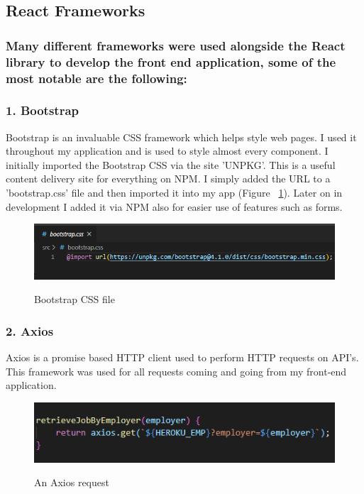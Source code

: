 \subsection{React Frameworks}
\subsubsection{Many different frameworks were used alongside the React library to develop the front end application, some of the most notable are the following:}

\subsubsection{1. Bootstrap}
Bootstrap is an invaluable CSS framework which helps style web pages. I used it throughout my application and is used to style almost every component. I initially imported the Bootstrap CSS via the site 'UNPKG'. This is a useful content delivery site for everything on NPM. I simply added the URL to a 'bootstrap.css' file and then imported it into my app (Figure ~\ref{boot_label}). Later on in development I added it via NPM also for easier use of features such as forms.

\begin{figure}[h]
    \centering
    \includegraphics[scale=0.4]{Images/bootstrap1.png} 
    \label{boot_label}
    \caption{Bootstrap CSS file}
\end{figure}

\subsubsection{2. Axios}
Axios is a promise based HTTP client used to perform HTTP requests on API's. This framework was used for all requests coming and going from my front-end application.

\begin{figure}[h]
    \centering
    \includegraphics[scale=0.5]{Images/axios.png} 
    \label{axios_label}
    \caption{An Axios request}
\end{figure}

